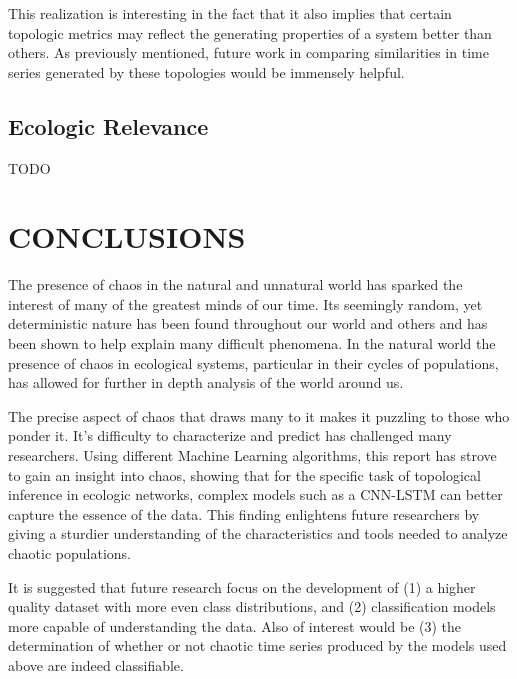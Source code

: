 \documentclass[letterpaper, 10 pt, conference]{ieeeconf}  %
\begin{document}
    This realization is interesting in the fact that it also implies that certain topologic metrics may reflect the generating properties of a system better than others. As previously mentioned, future work in comparing similarities in time series generated by these topologies would be immensely helpful.

\subsection{Ecologic Relevance}

    TODO
    

\section{CONCLUSIONS}
	The presence of chaos in the natural and unnatural world has sparked the interest of many of the greatest minds of our time. Its seemingly random, yet deterministic nature has been found throughout our world and others and has been shown to help explain many difficult phenomena. In the natural world the presence of chaos in ecological systems, particular in their cycles of populations, has allowed for further in depth analysis of the world around us. 

	The precise aspect of chaos that draws many to it makes it puzzling to those who ponder it. It's difficulty to characterize and predict has challenged many researchers. Using different Machine Learning algorithms, this report has strove to gain an insight into chaos, showing that for the specific task of topological inference in ecologic networks, complex models such as a CNN-LSTM can better capture the essence of the data. This finding enlightens future researchers by giving a sturdier understanding of the characteristics and tools needed to analyze chaotic populations. 
    
    It is suggested that future research focus on the development of (1) a higher quality dataset with more even class distributions, and (2) classification models more capable of understanding the data. Also of interest would be (3) the determination of whether or not chaotic time series produced by the models used above are indeed classifiable. 
    
\end{document}
